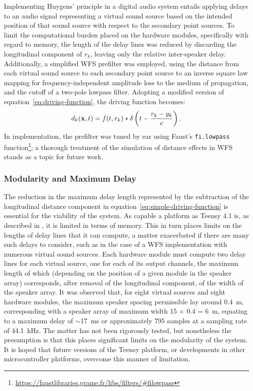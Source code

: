 Implementing Huygens' principle in a digital audio system entails applying
delays to an audio signal representing a virtual sound source based on the
intended position of that sound source with respect to the secondary point
sources.
To limit the computational burden placed on the hardware modules, specifically
with regard to memory, the length of the delay lines was reduced by discarding
the longitudinal component of $r_k$, leaving only the relative inter-speaker
delay.
Additionally, a simplified WFS prefilter was employed, using the distance
from each virtual sound source to each secondary point source to an inverse
square law mapping for frequency-independent amplitude loss to the medium of
propagation, and the cutoff of a two-pole lowpass filter.
Adopting a modified version of equation~\eqref{eq:driving-function}, the
driving function becomes:
\begin{equation}
    \label{eq:simple-driving-function}
    d_k(\mathbf{x},t) = f(t, r_k) \ast \delta\left(t - \frac{r_k-y_k}{c}\right).
\end{equation}
In implementation, the prefilter was tuned by ear using Faust's
\texttt{fi.lowpass} function\footnote{
    \url{https://faustlibraries.grame.fr/libs/filters/\#filowpass}
};
a thorough treatment of the simulation of distance effects in WFS stands as a
topic for future work.

\subsubsection{Modularity and Maximum Delay}

The reduction in the maximum delay length represented by the subtraction of
the longitudinal distance component in
equation~\eqref{eq:simple-driving-function} is essential for the viability of
the system.
As capable a platform as Teensy 4.1 is, as described in
, it is limited in terms of memory.
This in turn places limits on the lengths of delay lines that it can compute,
a matter exacerbated if there are many such delays to consider, such as in the
case of a WFS implementation with numerous virtual sound sources.
Each hardware module must compute two delay lines for each virtual source, one
for each of its output channels, the maximum length of which (depending on
the position of a given module in the speaker array) corresponds, after removal
of the longitudinal component, of the width of the speaker array.
It was observed that, for eight virtual sources and eight hardware modules,
the maximum speaker spacing permissible lay around \qty{.4}{\m},
corresponding with a speaker array of maximum width 15 $\times$ 0.4 =
\qty{6}{\m}, equating to a maximum delay of $\sim$\qty{17}{\ms} or
approximately 795 samples at a sampling rate of \qty{44.1}{\kHz}.
The matter has not been rigorously tested, but nonetheless the presumption is
that this places significant limits on the modularity of the system.
It is hoped that future versions of the Teensy platform, or developments in
other microcontroller platforms, overcome this manner of limitation.

